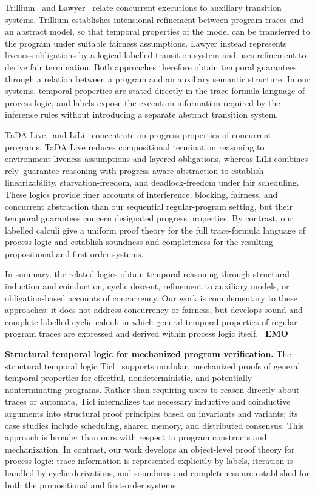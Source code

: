 \documentclass[manuscript,screen]{acmart}
\newcommand{\A}[1]{\mbox{ \textbf{#1} }}
\newcommand{\EMO}{\A{EMO}}
\begin{document}
Trillium~\cite{Trillium24} and Lawyer~\cite{Lawyer26} relate concurrent executions to auxiliary transition systems.
Trillium establishes intensional refinement between program traces and an abstract model, so that temporal properties of the model can be transferred to the program under suitable fairness assumptions.
Lawyer instead represents liveness obligations by a logical labelled transition system and uses refinement to derive fair termination.
Both approaches therefore obtain temporal guarantees through a relation between a program and an auxiliary semantic structure.
In our systems, temporal properties are stated directly in the trace-formula language of process logic, and labels expose the execution information required by the inference rules without introducing a separate abstract transition system.

TaDA Live~\cite{TaDALive21} and LiLi~\cite{LiLi16} concentrate on progress properties of concurrent programs.
TaDA Live reduces compositional termination reasoning to environment liveness assumptions and layered obligations, whereas LiLi combines rely--guarantee reasoning with progress-aware abstraction to establish linearizability, starvation-freedom, and deadlock-freedom under fair scheduling.
These logics provide finer accounts of interference, blocking, fairness, and concurrent abstraction than our sequential regular-program setting, but their temporal guarantees concern designated progress properties.
By contrast, our labelled calculi give a uniform proof theory for the full trace-formula language of process logic and establish soundness and completeness for the resulting propositional and first-order systems.

In summary, the related logics obtain temporal reasoning through structural induction and coinduction, cyclic descent, refinement to auxiliary models, or obligation-based accounts of concurrency.
Our work is complementary to these approaches: it does not address concurrency or fairness, but develops sound and complete labelled cyclic calculi in which general temporal properties of regular-program traces are expressed and derived within process logic itself.
\EMO


\textbf{Structural temporal logic for mechanized program verification.}
The structural temporal logic Ticl~\cite{Ticl25} supports modular, mechanized proofs of general temporal properties for effectful, nondeterministic, and potentially nonterminating programs.
Rather than requiring users to reason directly about traces or automata, Ticl internalizes the necessary inductive and coinductive arguments into structural proof principles based on invariants and variants; its case studies include scheduling, shared memory, and distributed consensus.
This approach is broader than ours with respect to program constructs and mechanization.
In contrast, our work develops an object-level proof theory for process logic: trace information is represented explicitly by labels, iteration is handled by cyclic derivations, and soundness and completeness are established for both the propositional and first-order systems.
\end{document}
